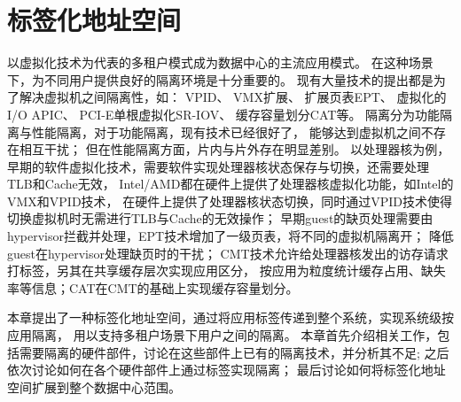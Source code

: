 

\chapter{标签化地址空间}
\label{chap:labeladdrspace}

以虚拟化技术为代表的多租户模式成为数据中心的主流应用模式。
在这种场景下，为不同用户提供良好的隔离环境是十分重要的。
现有大量技术的提出都是为了解决虚拟机之间隔离性，如：
VPID、
VMX扩展、
扩展页表EPT、
虚拟化的I/O APIC、
PCI-E单根虚拟化SR-IOV、
缓存容量划分CAT等。
隔离分为功能隔离与性能隔离，对于功能隔离，现有技术已经很好了，
能够达到虚拟机之间不存在相互干扰；
但在性能隔离方面，片内与片外存在明显差别。
以处理器核为例，
早期的软件虚拟化技术，需要软件实现处理器核状态保存与切换，还需要处理TLB和Cache无效，
Intel/AMD都在硬件上提供了处理器核虚拟化功能，如Intel的VMX和VPID技术，
在硬件上提供了处理器核状态切换，同时通过VPID技术使得切换虚拟机时无需进行TLB与Cache的无效操作；
早期guest的缺页处理需要由hypervisor拦截并处理，EPT技术增加了一级页表，将不同的虚拟机隔离开；
降低guest在hypervisor处理缺页时的干扰；
CMT技术允许给处理器核发出的访存请求打标签，另其在共享缓存层次实现应用区分，
按应用为粒度统计缓存占用、缺失率等信息；CAT在CMT的基础上实现缓存容量划分。

%
%
%
%
%

本章提出了一种标签化地址空间，通过将应用标签传递到整个系统，实现系统级按应用隔离，
用以支持多租户场景下用户之间的隔离。
本章首先介绍相关工作，包括需要隔离的硬件部件，讨论在这些部件上已有的隔离技术，并分析其不足;
之后依次讨论如何在各个硬件部件上通过标签实现隔离；
最后讨论如何将标签化地址空间扩展到整个数据中心范围。




